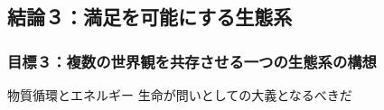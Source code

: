 \subsection{結論３：満足を可能にする生態系}\label{ux7d50ux8ad6uxff13ux6e80ux8db3ux3092ux53efux80fdux306bux3059ux308bux751fux614bux7cfb}

\subsubsection{目標３：複数の世界観を共存させる一つの生態系の構想}\label{ux76eeux6a19uxff13ux8907ux6570ux306eux4e16ux754cux89b3ux3092ux5171ux5b58ux3055ux305bux308bux4e00ux3064ux306eux751fux614bux7cfbux306eux69cbux60f3}

物質循環とエネルギー 生命が問いとしての大義となるべきだ
